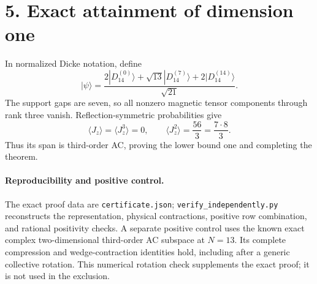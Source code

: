 \documentclass[11pt]{article}
\begin{document}
\section*{5. Exact attainment of dimension one}
In normalized Dicke notation, define
\[
 |\psi\rangle=\frac{2|D_{14}^{(0)}\rangle
 +\sqrt{13}|D_{14}^{(7)}\rangle+2|D_{14}^{(14)}\rangle}{\sqrt{21}}.
\]
The support gaps are seven, so all nonzero magnetic tensor components through rank three vanish. Reflection-symmetric probabilities give
\[
 \langle J_z\rangle=\langle J_z^3\rangle=0,
 \qquad \langle J_z^2\rangle=\frac{56}{3}
 =\frac{7\cdot8}{3}.
\]
Thus its span is third-order AC, proving the lower bound one and completing the theorem.

\paragraph{Reproducibility and positive control.}
The exact proof data are \texttt{certificate.json}; \texttt{verify\_independently.py} reconstructs the representation, physical contractions, positive row combination, and rational positivity checks. A separate positive control uses the known exact complex two-dimensional third-order AC subspace at $N=13$. Its complete compression and wedge-contraction identities hold, including after a generic collective rotation. This numerical rotation check supplements the exact proof; it is not used in the exclusion.
\end{document}
